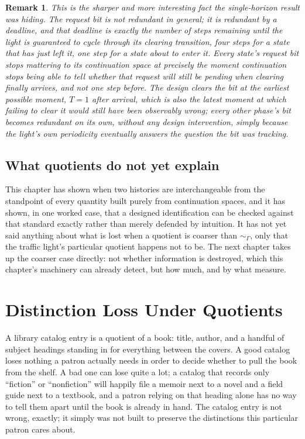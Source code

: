 \documentclass[11pt]{report}
\newtheorem{remark}{Remark}[chapter]
\begin{document}
\begin{remark}
This is the sharper and more interesting fact the single-horizon
result was hiding. The request bit is not redundant in general; it is
redundant \emph{by a deadline}, and that deadline is exactly the
number of steps remaining until the light is guaranteed to cycle
through its clearing transition, four steps for a state that has just
left it, one step for a state about to enter it. Every state's
request bit stops mattering to its continuation space at precisely
the moment continuation stops being able to tell whether that request
will still be pending when clearing finally arrives, and not one step
before. The design clears the bit at the earliest possible moment,
$T=1$ after arrival, which is also the latest moment at which failing
to clear it would still have been observably wrong; every other
phase's bit becomes redundant on its own, without any design
intervention, simply because the light's own periodicity eventually
answers the question the bit was tracking.
\end{remark}

\section*{What quotients do not yet explain}

This chapter has shown when two histories are interchangeable from
the standpoint of every quantity built purely from continuation
spaces, and it has shown, in one worked case, that a designed
identification can be checked against that standard exactly rather
than merely defended by intuition. It has not yet said anything about
what is lost when a quotient is coarser than $\sim_\Gamma$, only that
the traffic light's particular quotient happens not to be. The next
chapter takes up the coarser case directly: not whether information is
destroyed, which this chapter's machinery can already detect, but how
much, and by what measure.

\chapter{Distinction Loss Under Quotients}

A library catalog entry is a quotient of a book: title, author, and a
handful of subject headings standing in for everything between the
covers. A good catalog loses nothing a patron actually needs in order
to decide whether to pull the book from the shelf. A bad one can lose
quite a lot; a catalog that records only ``fiction'' or
``nonfiction'' will happily file a memoir next to a novel and a field
guide next to a textbook, and a patron relying on that heading alone
has no way to tell them apart until the book is already in hand. The
catalog entry is not wrong, exactly; it simply was not built to
preserve the distinctions this particular patron cares about.
\end{document}
